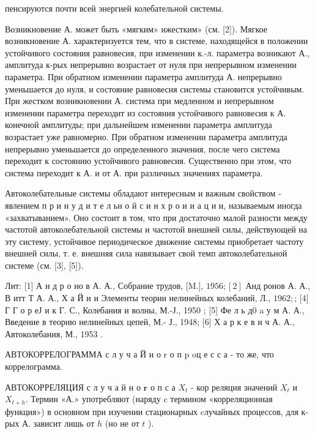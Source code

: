 \documentclass[10pt]{article}
\begin{document}
пенсируются почти всей энергией колебательной системы.



Возникновение А. может быть «мягким» ижестким» (см. [2]). Мягкое возникновение А. характеризуется тем, что в системе, находящейся в положении устойчивого состояния равновесия, при изменении к.-л. параметра возникают А., амплитуда к-рых непрерывно возрастает от нуля при непрерывном изменении параметра. При обратном изменении параметра амплитуда А. непрерывно уменьшается до нуля, и состояние равновесия системы становится устойчивым. При жестком возникновении А. система при медленном и непрерывном изменении параметра переходит из состояния устойчивого равновесия к А. конечной амплитуды; при дальнейшем изменении параметра амплитуда возрастает уже равномерно. При обратном изменении параметра амплитуда непрерывно уменьшается до определенного значения, после чего система переходит к состоянию устойчивого равновесия. Существенно при этом, что система переходит к А. и от А. при различных значениях параметра.



Автоколебательные системы обладают интересным и важным свойством - явлением п р и н у д и т е л ьн о й с и н х р о и и а ц и и, называемым иногда «захватыванием». Оно состоит в том, что при достаточно малой разности между частотой автоколебательной системы и частотой внешней силы, действующей на эту систему, устойчивое периодическое движение системы приобретает частоту внешней силы, т. е. внешняя сила навязывает свой темп автоколебательной системе (см. [3], [5]).



Лит: [1] А н д р о но в А. А., Собрание трудов, [M.], $1956 ;[2]$ Анд ронов А. А., В итт Т А. А., Х а Й и и Элементы теории нелинейных колебаний, Л., $1962 ;$; [4] Г Г о р еЈ и к Г. С., Колебания и волны, М.-Ј., 1950 ; [5] Фе л ь д$\overline{0}$ a у м А. А., Введение в теорию нелинейных цепей, М.- Ј., 1948; [6] Х а р к е в и ч А. А., Автоколебания, М., 1953 .



АВТОКОРРЕЛОГРАММА с л у ч а Й н о $\mathrm{r}$ о п $\mathrm{p}$ oц е с с а - то же, что коррелограмма.



АВТОКОРРЕЛЯЦИЯ с л у ч а й н о $\boldsymbol{r}$ о п с а $X_{t}$ - кор реляция значений $X_{t}$ и $X_{t+h}$. Термин «А.» употребляют (наряду $\mathrm{c}$ термином «корреляционная функция») в основном при изучении стационарных cлучайных процессов, для к-рых А. зависит лишь от $h$ (но не от $t$ ).
\end{document}
